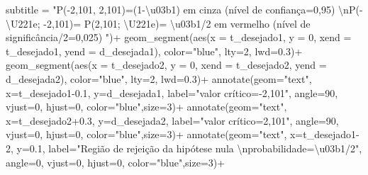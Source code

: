 \documentclass[
]{book}
\newenvironment{Shaded}{\begin{snugshade}}{\end{snugshade}}
\newcommand{\AttributeTok}[1]{\textcolor[rgb]{0.77,0.63,0.00}{#1}}
\newcommand{\DecValTok}[1]{\textcolor[rgb]{0.00,0.00,0.81}{#1}}
\newcommand{\FloatTok}[1]{\textcolor[rgb]{0.00,0.00,0.81}{#1}}
\newcommand{\FunctionTok}[1]{\textcolor[rgb]{0.00,0.00,0.00}{#1}}
\newcommand{\NormalTok}[1]{#1}
\newcommand{\SpecialCharTok}[1]{\textcolor[rgb]{0.00,0.00,0.00}{#1}}
\newcommand{\StringTok}[1]{\textcolor[rgb]{0.31,0.60,0.02}{#1}}
\begin{document}
\begin{Shaded}
\begin{Highlighting}[]
       \AttributeTok{subtitle =} \StringTok{"P({-}2,101, 2,101)=(1{-}\textbackslash{}u03b1) em cinza (nível de confiança=0,95) }\SpecialCharTok{\textbackslash{}n}\StringTok{P({-}\textbackslash{}U221e; {-}2,101)= P(2,101; \textbackslash{}U221e)= \textbackslash{}u03b1/2 em vermelho (nível de significância/2=0,025) "}\NormalTok{)}\SpecialCharTok{+} \FunctionTok{geom\_segment}\NormalTok{(}\FunctionTok{aes}\NormalTok{(}\AttributeTok{x =}\NormalTok{ t\_desejado1, }\AttributeTok{y =} \DecValTok{0}\NormalTok{, }\AttributeTok{xend =}\NormalTok{ t\_desejado1, }\AttributeTok{yend =}\NormalTok{ d\_desejada1), }\AttributeTok{color=}\StringTok{"blue"}\NormalTok{, }\AttributeTok{lty=}\DecValTok{2}\NormalTok{, }\AttributeTok{lwd=}\FloatTok{0.3}\NormalTok{)}\SpecialCharTok{+}
 \FunctionTok{geom\_segment}\NormalTok{(}\FunctionTok{aes}\NormalTok{(}\AttributeTok{x =}\NormalTok{ t\_desejado2, }\AttributeTok{y =} \DecValTok{0}\NormalTok{, }\AttributeTok{xend =}\NormalTok{ t\_desejado2, }\AttributeTok{yend =}\NormalTok{ d\_desejada2), }\AttributeTok{color=}\StringTok{"blue"}\NormalTok{, }\AttributeTok{lty=}\DecValTok{2}\NormalTok{, }\AttributeTok{lwd=}\FloatTok{0.3}\NormalTok{)}\SpecialCharTok{+}
  \FunctionTok{annotate}\NormalTok{(}\AttributeTok{geom=}\StringTok{"text"}\NormalTok{, }\AttributeTok{x=}\NormalTok{t\_desejado1}\FloatTok{{-}0.1}\NormalTok{, }\AttributeTok{y=}\NormalTok{d\_desejada1, }\AttributeTok{label=}\StringTok{"valor crítico={-}2,101"}\NormalTok{, }\AttributeTok{angle=}\DecValTok{90}\NormalTok{, }\AttributeTok{vjust=}\DecValTok{0}\NormalTok{, }\AttributeTok{hjust=}\DecValTok{0}\NormalTok{, }\AttributeTok{color=}\StringTok{"blue"}\NormalTok{,}\AttributeTok{size=}\DecValTok{3}\NormalTok{)}\SpecialCharTok{+}
  \FunctionTok{annotate}\NormalTok{(}\AttributeTok{geom=}\StringTok{"text"}\NormalTok{, }\AttributeTok{x=}\NormalTok{t\_desejado2}\FloatTok{+0.3}\NormalTok{, }\AttributeTok{y=}\NormalTok{d\_desejada2, }\AttributeTok{label=}\StringTok{"valor crítico=2,101"}\NormalTok{, }\AttributeTok{angle=}\DecValTok{90}\NormalTok{, }\AttributeTok{vjust=}\DecValTok{0}\NormalTok{, }\AttributeTok{hjust=}\DecValTok{0}\NormalTok{, }\AttributeTok{color=}\StringTok{"blue"}\NormalTok{,}\AttributeTok{size=}\DecValTok{3}\NormalTok{)}\SpecialCharTok{+}
 \FunctionTok{annotate}\NormalTok{(}\AttributeTok{geom=}\StringTok{"text"}\NormalTok{, }\AttributeTok{x=}\NormalTok{t\_desejado1}\DecValTok{{-}2}\NormalTok{, }\AttributeTok{y=}\FloatTok{0.1}\NormalTok{, }\AttributeTok{label=}\StringTok{"Região de rejeição da hipótese nula }\SpecialCharTok{\textbackslash{}n}\StringTok{probabilidade=\textbackslash{}u03b1/2"}\NormalTok{, }\AttributeTok{angle=}\DecValTok{0}\NormalTok{, }\AttributeTok{vjust=}\DecValTok{0}\NormalTok{, }\AttributeTok{hjust=}\DecValTok{0}\NormalTok{, }\AttributeTok{color=}\StringTok{"blue"}\NormalTok{,}\AttributeTok{size=}\DecValTok{3}\NormalTok{)}\SpecialCharTok{+}

\end{Highlighting}
\end{Shaded}
\end{document}
